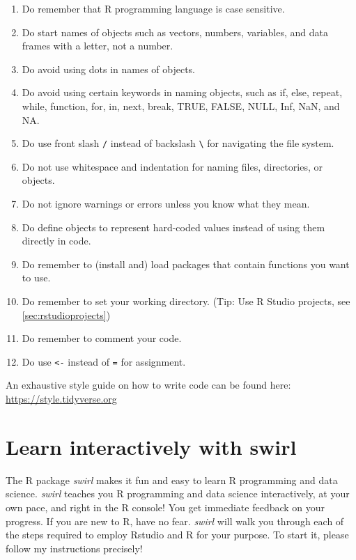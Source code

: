 \documentclass[
  12pt,
  oneside]{book}
\providecommand{\tightlist}{%
  \setlength{\itemsep}{0pt}\setlength{\parskip}{0pt}}
\theoremstyle{definition}
\theoremstyle{definition}
\theoremstyle{definition}
\theoremstyle{definition}
\theoremstyle{remark}
\begin{document}
\begin{enumerate}
\def\labelenumi{\arabic{enumi}.}
\tightlist
\item
  Do remember that R programming language is case sensitive.
\item
  Do start names of objects such as vectors, numbers, variables, and data frames with a letter, not a number.
\item
  Do avoid using dots in names of objects.
\item
  Do avoid using certain keywords in naming objects, such as if, else, repeat, while, function, for, in, next, break, TRUE, FALSE, NULL, Inf, NaN, and NA.
\item
  Do use front slash \texttt{/} instead of backslash \texttt{\textbackslash{}} for navigating the file system.
\item
  Do not use whitespace and indentation for naming files, directories, or objects.
\item
  Do not ignore warnings or errors unless you know what they mean.
\item
  Do define objects to represent hard-coded values instead of using them directly in code.
\item
  Do remember to (install and) load packages that contain functions you want to use.
\item
  Do remember to set your working directory. (Tip: Use R Studio projects, see \ref{sec:rstudioprojects})
\item
  Do remember to comment your code.
\item
  Do use \texttt{\textless{}-} instead of \texttt{=} for assignment.
\end{enumerate}

An exhaustive style guide on how to write code can be found here: \url{https://style.tidyverse.org}

\hypertarget{swirl}{%
\chapter{Learn interactively with swirl}\label{swirl}}

The R package \emph{swirl} makes it fun and easy to learn R programming and data science.
\emph{swirl} teaches you R programming and data science interactively, at your own pace,
and right in the R console! You get immediate feedback on your progress.
If you are new to R, have no fear. \emph{swirl} will walk you through each of the steps
required to employ Rstudio and R for your purpose.
To start it, please follow my instructions precisely!
\end{document}
